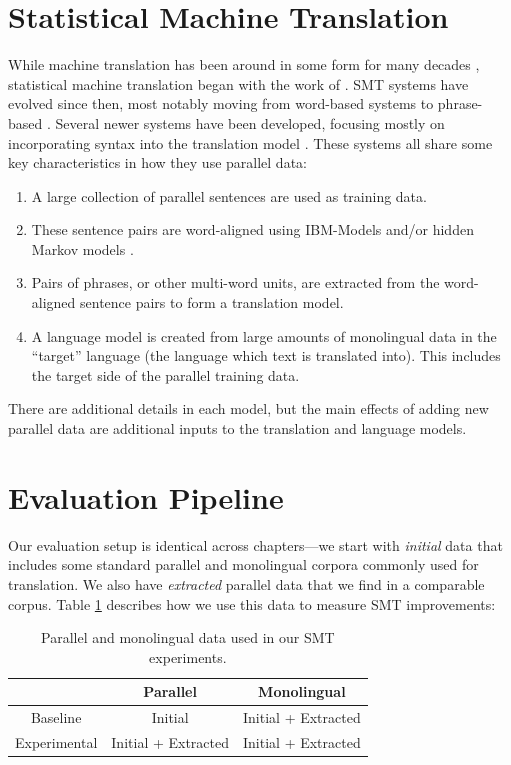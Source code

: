 \section{Statistical Machine Translation}
While machine translation has been around in some form for many decades
\citep{Locke55}, statistical machine translation began with the work of
\citet{Brown93}. SMT systems have evolved since then, most notably moving from
word-based systems to phrase-based \citep{Koehn03}. Several newer systems have
been developed, focusing mostly on incorporating syntax into the translation
model \citep{Chiang05,Quirk05,Liu06,Galley06}. These systems all share some key
characteristics in how they use parallel data:

\begin{enumerate}
\item A large collection of parallel sentences are used as training data.
\item These sentence pairs are word-aligned using IBM-Models \citep{Brown93}
and/or hidden Markov models \citep{Vogel96}.
\item Pairs of phrases, or other multi-word units, are extracted from the
word-aligned sentence pairs to form a translation model.
\item A language model is created from large amounts of monolingual data in the
``target'' language (the language which text is translated into). This includes
the target side of the parallel training data.
\end{enumerate}

There are additional details in each model, but the main effects of adding new
parallel data are additional inputs to the translation and language models.

\section{Evaluation Pipeline}
Our evaluation setup is identical across chapters---we start with {\em initial}
data that includes some standard parallel and monolingual corpora commonly used for 
translation. We also have {\em extracted} parallel data that we find in a comparable
corpus. Table \ref{tab:exp_setup} describes how we use this data to measure SMT
improvements:

\begin{table}
\begin{center}
\begin{tabular}{|c||c|c|}
\hline
& Parallel & Monolingual \\
\hline
Baseline & Initial & Initial + Extracted \\
\hline
Experimental & Initial + Extracted & Initial + Extracted \\
\hline
\end{tabular}
\end{center}
\label{tab:exp_setup}
\caption{Parallel and monolingual data used in our SMT experiments.}
\end{table}

